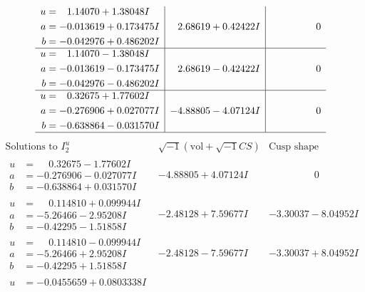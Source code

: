\documentclass[1p]{elsarticle_modified}
\theoremstyle{definition}
\newcommand{\I}{\sqrt{-1}}
\begin{document}
$$\begin{array}{c|c|c}
\begin{aligned}
u &= \phantom{-}1.14070 + 1.38048 I \\
a &= -0.013619 + 0.173475 I \\
b &= -0.042976 + 0.486202 I\end{aligned}
 & \phantom{-}2.68619 + 0.42422 I & \phantom{-0.000000 } 0 \\ \hline\begin{aligned}
u &= \phantom{-}1.14070 - 1.38048 I \\
a &= -0.013619 - 0.173475 I \\
b &= -0.042976 - 0.486202 I\end{aligned}
 & \phantom{-}2.68619 - 0.42422 I & \phantom{-0.000000 } 0 \\ \hline\begin{aligned}
u &= \phantom{-}0.32675 + 1.77602 I \\
a &= -0.276906 + 0.027077 I \\
b &= -0.638864 - 0.031570 I\end{aligned}
 & -4.88805 - 4.07124 I & \phantom{-0.000000 } 0\\
 \hline 
 \end{array}$$\newpage$$\begin{array}{c|c|c}  
\text{Solutions to }I^u_{2}& \I (\text{vol} + \sqrt{-1}CS) & \text{Cusp shape}\\
 \hline 
\begin{aligned}
u &= \phantom{-}0.32675 - 1.77602 I \\
a &= -0.276906 - 0.027077 I \\
b &= -0.638864 + 0.031570 I\end{aligned}
 & -4.88805 + 4.07124 I & \phantom{-0.000000 } 0 \\ \hline\begin{aligned}
u &= \phantom{-}0.114810 + 0.099944 I \\
a &= -5.26466 - 2.95208 I \\
b &= -0.42295 - 1.51858 I\end{aligned}
 & -2.48128 + 7.59677 I & -3.30037 - 8.04952 I \\ \hline\begin{aligned}
u &= \phantom{-}0.114810 - 0.099944 I \\
a &= -5.26466 + 2.95208 I \\
b &= -0.42295 + 1.51858 I\end{aligned}
 & -2.48128 - 7.59677 I & -3.30037 + 8.04952 I \\ \hline\begin{aligned}
u &= -0.0455659 + 0.0803338 I \\

\end{aligned}
\end{array}$$
\end{document}
